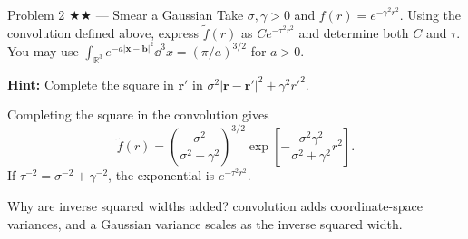 \documentclass[11pt]{article}
\begin{document}
\begin{problem}{Problem 2 ★★ — Smear a Gaussian}
Take $\sigma,\gamma>0$ and $f(r)=e^{-\gamma^2r^2}$.
Using the convolution defined above, express $\widetilde f(r)$ as
$C e^{-\tau^2r^2}$ and determine both $C$ and $\tau$.
You may use $\int_{\mathbb R^3}e^{-a|\bm x-\bm b|^2}\dd^3x=(\pi/a)^{3/2}$
for $a>0$.

\textbf{Hint:} Complete the square in $\bm r'$ in
$\sigma^2|\bm r-\bm r'|^2+\gamma^2r'^2$.
\end{problem}
\begin{solution}
Completing the square in the convolution gives
\[
\widetilde f(r)=\left(\frac{\sigma^2}{\sigma^2+\gamma^2}\right)^{3/2}
\exp\!\left[-\frac{\sigma^2\gamma^2}{\sigma^2+\gamma^2}r^2\right].
\]
If $\tau^{-2}=\sigma^{-2}+\gamma^{-2}$, the exponential is
$e^{-\tau^2r^2}$.
\end{solution}
\begin{quiz}
Why are inverse squared widths added? \answer convolution adds coordinate-space
variances, and a Gaussian variance scales as the inverse squared width.
\end{quiz}
\end{document}
